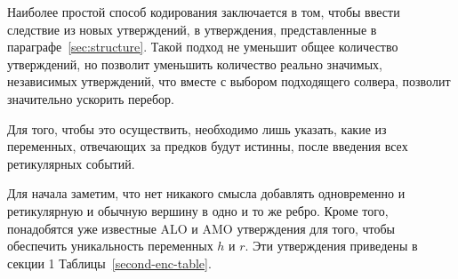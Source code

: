 Наиболее простой способ кодирования заключается в том, чтобы ввести следствие из новых утверждений, в утверждения, представленные в параграфе~\ref{sec:structure}.
Такой подход не уменьшит общее количество утверждений, но позволит уменьшить количество реально значимых, независимых утверждений, что вместе с выбором подходящего солвера, позволит значительно ускорить перебор.

Для того, чтобы это осуществить, необходимо лишь указать, какие из переменных, отвечающих за предков будут истинны, после введения всех ретикулярных событий.

Для начала заметим, что нет никакого смысла добавлять одновременно и ретикулярную и обычную вершину в одно и то же ребро.
Кроме того, понадобятся уже известные ALO и AMO утверждения для того, чтобы обеспечить уникальность переменных $h$ и $r$.
Эти утверждения приведены в секции 1 Таблицы~\ref{second-enc-table}.

